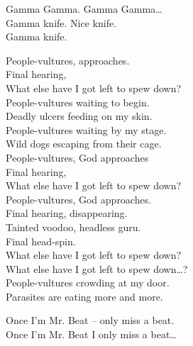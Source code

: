 Gamma Gamma. Gamma Gamma… \\

Gamma knife. Nice knife. \\
Gamma knife. \\




People-vultures,  approaches. \\
Final hearing, \\
What else have I got left to spew down? \\

People-vultures waiting to begin. \\
Deadly ulcers feeding on my skin. \\

People-vultures waiting by my stage. \\
Wild dogs escaping from their cage. \\

People-vultures, God approaches \\
Final hearing, \\
What else have I got left to spew down? \\

People-vultures, God approaches. \\
Final hearing, disappearing. \\
Tainted voodoo, headless guru. \\
Final head-spin. \\
What else have I got left to spew down? \\

What else have I got left to spew down…? \\

People-vultures crowding at my door. \\
Parasites are eating more and more. \\




Once I'm Mr. Beat -- only miss a beat. \\
Once I'm Mr. Beat I only miss a beat… \\

